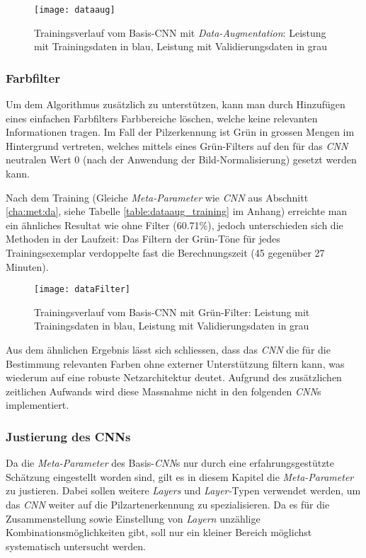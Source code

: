 \begin{figure}[h]
	\centering
	\texttt{[image: dataaug]}
	\caption[Trainingsverlauf Basis-\textit{CNN} mit \textit{Data-Augmentation}]{Trainingsverlauf vom Basis-{CNN} mit \textit{Data-Augmentation}: Leistung mit Trainingsdaten in blau, Leistung mit Validierungsdaten in grau}
	\label{img:dataaug_cnn}
\end{figure}

\subsubsection{Farbfilter}
Um dem Algorithmus zusätzlich zu unterstützen, kann man durch Hinzufügen eines einfachen Farbfilters Farbbereiche löschen, welche keine relevanten Informationen tragen. Im Fall der Pilzerkennung ist Grün in grossen Mengen im Hintergrund vertreten, welches mittels eines Grün-Filters auf den für das \textit{CNN} neutralen Wert 0 (nach der Anwendung der Bild-Normalisierung) gesetzt werden kann.

Nach dem Training (Gleiche \textit{Meta-Parameter} wie \textit{CNN} aus Abschnitt \ref{cha:met:da}, siehe Tabelle \ref{table:dataaug_training} im Anhang) erreichte man ein ähnliches Resultat wie ohne Filter (60.71\%), jedoch unterschieden sich die Methoden in der Laufzeit: Das Filtern der Grün-Töne für jedes Trainingsexemplar verdoppelte fast die Berechnungszeit (45 gegenüber 27 Minuten).

\begin{figure}[h]
	\centering
	\texttt{[image: dataFilter]}
	\caption[Trainingsverlauf Basis-\textit{CNN} mit Grün-Filter]{Trainingsverlauf vom Basis-{CNN} mit Grün-Filter: Leistung mit Trainingsdaten in blau, Leistung mit Validierungsdaten in grau}
	\label{img:gf_cnn}
\end{figure}

Aus dem ähnlichen Ergebnis lässt sich schliessen, dass das \textit{CNN} die für die Bestimmung relevanten Farben ohne externer Unterstützung filtern kann, was wiederum auf eine robuste Netzarchitektur deutet. Aufgrund des zusätzlichen zeitlichen Aufwands wird diese Massnahme nicht in den folgenden \textit{CNN}s implementiert.

\subsubsection{Justierung des CNNs}
Da die \textit{Meta-Parameter} des Basis-\textit{CNN}s nur durch eine erfahrungsgestützte Schätzung eingestellt worden sind, gilt es in diesem Kapitel die \textit{Meta-Parameter} zu justieren. Dabei sollen weitere \textit{Layers} und \textit{Layer-}Typen verwendet werden, um das \textit{CNN} weiter auf die Pilzartenerkennung zu spezialisieren. Da es für die Zusammenstellung sowie Einstellung von \textit{Layern} unzählige Kombinationsmöglichkeiten gibt, soll nur ein kleiner Bereich möglichst systematisch untersucht werden.

